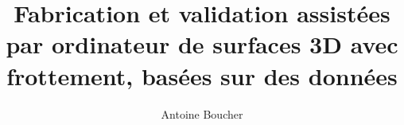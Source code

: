 
\title{Fabrication et validation assistées par ordinateur de surfaces 3D avec frottement, basées sur des données}
\author{Antoine Boucher}
\maketitle
